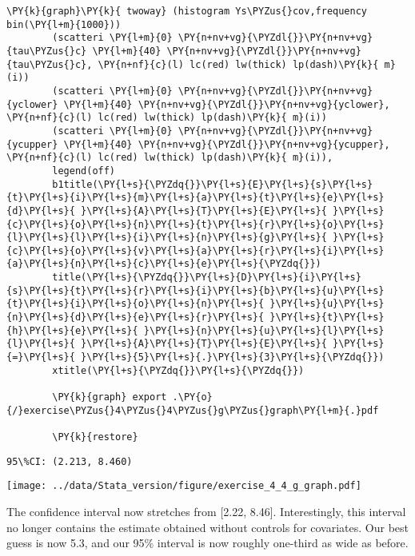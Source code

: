 \documentclass[11pt,notitlepage]{article}\usepackage[]{graphicx}\usepackage[]{color}
\makeatletter
\newenvironment{kframe}{%
 \def\at@end@of@kframe{}%
 \ifinner\ifhmode%
  \def\at@end@of@kframe{\end{minipage}}%
  \begin{minipage}{\columnwidth}%
 \fi\fi%
 \def\FrameCommand##1{\hskip\@totalleftmargin \hskip-\fboxsep
 \colorbox{shadecolor}{##1}\hskip-\fboxsep
     \hskip-\linewidth \hskip-\@totalleftmargin \hskip\columnwidth}%
 \MakeFramed {\advance\hsize-\width
   \@totalleftmargin\z@ \linewidth\hsize
   \@setminipage}}%
 {\par\unskip\endMakeFramed%
 \at@end@of@kframe}
\newenvironment{knitrout}{}{} %
\makeatother
\begin{document}
\begin{enumerate}[a)]
\begin{knitrout}
\begin{kframe}
\begin{Verbatim}[commandchars=\\\{\}]
        \PY{k}{graph}\PY{k}{ twoway} (histogram Ys\PYZus{}cov,frequency bin(\PY{l+m}{1000})) 
        (scatteri \PY{l+m}{0} \PY{n+nv+vg}{\PYZdl{}}\PY{n+nv+vg}{tau\PYZus{}c} \PY{l+m}{40} \PY{n+nv+vg}{\PYZdl{}}\PY{n+nv+vg}{tau\PYZus{}c}, \PY{n+nf}{c}(l) lc(red) lw(thick) lp(dash)\PY{k}{ m}(i)) 
        (scatteri \PY{l+m}{0} \PY{n+nv+vg}{\PYZdl{}}\PY{n+nv+vg}{yclower} \PY{l+m}{40} \PY{n+nv+vg}{\PYZdl{}}\PY{n+nv+vg}{yclower}, \PY{n+nf}{c}(l) lc(red) lw(thick) lp(dash)\PY{k}{ m}(i)) 
        (scatteri \PY{l+m}{0} \PY{n+nv+vg}{\PYZdl{}}\PY{n+nv+vg}{ycupper} \PY{l+m}{40} \PY{n+nv+vg}{\PYZdl{}}\PY{n+nv+vg}{ycupper}, \PY{n+nf}{c}(l) lc(red) lw(thick) lp(dash)\PY{k}{ m}(i)), 
        legend(off) 
        b1title(\PY{l+s}{\PYZdq{}}\PY{l+s}{E}\PY{l+s}{s}\PY{l+s}{t}\PY{l+s}{i}\PY{l+s}{m}\PY{l+s}{a}\PY{l+s}{t}\PY{l+s}{e}\PY{l+s}{d}\PY{l+s}{ }\PY{l+s}{A}\PY{l+s}{T}\PY{l+s}{E}\PY{l+s}{ }\PY{l+s}{c}\PY{l+s}{o}\PY{l+s}{n}\PY{l+s}{t}\PY{l+s}{r}\PY{l+s}{o}\PY{l+s}{l}\PY{l+s}{l}\PY{l+s}{i}\PY{l+s}{n}\PY{l+s}{g}\PY{l+s}{ }\PY{l+s}{c}\PY{l+s}{o}\PY{l+s}{v}\PY{l+s}{a}\PY{l+s}{r}\PY{l+s}{i}\PY{l+s}{a}\PY{l+s}{n}\PY{l+s}{c}\PY{l+s}{e}\PY{l+s}{\PYZdq{}}) 
        title(\PY{l+s}{\PYZdq{}}\PY{l+s}{D}\PY{l+s}{i}\PY{l+s}{s}\PY{l+s}{t}\PY{l+s}{r}\PY{l+s}{i}\PY{l+s}{b}\PY{l+s}{u}\PY{l+s}{t}\PY{l+s}{i}\PY{l+s}{o}\PY{l+s}{n}\PY{l+s}{ }\PY{l+s}{u}\PY{l+s}{n}\PY{l+s}{d}\PY{l+s}{e}\PY{l+s}{r}\PY{l+s}{ }\PY{l+s}{t}\PY{l+s}{h}\PY{l+s}{e}\PY{l+s}{ }\PY{l+s}{n}\PY{l+s}{u}\PY{l+s}{l}\PY{l+s}{l}\PY{l+s}{ }\PY{l+s}{A}\PY{l+s}{T}\PY{l+s}{E}\PY{l+s}{ }\PY{l+s}{=}\PY{l+s}{ }\PY{l+s}{5}\PY{l+s}{.}\PY{l+s}{3}\PY{l+s}{\PYZdq{}}) 
        xtitle(\PY{l+s}{\PYZdq{}}\PY{l+s}{\PYZdq{}})
        
        \PY{k}{graph} export .\PY{o}{/}exercise\PYZus{}4\PYZus{}4\PYZus{}g\PYZus{}graph\PY{l+m}{.}pdf
        
        \PY{k}{restore}
\end{Verbatim}

    \begin{Verbatim}[commandchars=\\\{\}]
95\%CI: (2.213, 8.460)
    \end{Verbatim}
\end{kframe}
{\centering \texttt{[image: ../data/Stata\_version/figure/exercise\_4\_4\_g\_graph.pdf]} 

}

\end{knitrout}

The confidence interval now stretches from [2.22, 8.46].  Interestingly, this interval no longer contains the estimate obtained without controls for covariates.  Our best guess is now 5.3, and our 95\% interval is now roughly one-third as wide as before.

\end{enumerate}
\end{document}
